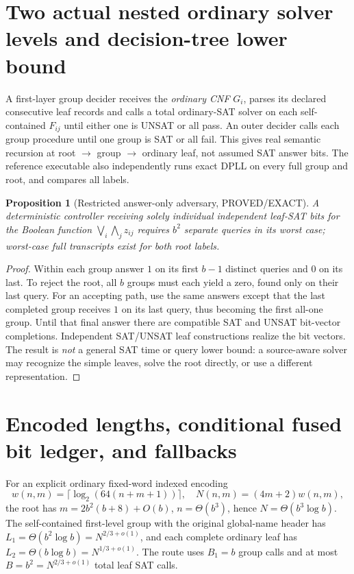 \documentclass[11pt]{article}
\newtheorem{proposition}[theorem]{Proposition}
\begin{document}
\section{Two actual nested ordinary solver levels and decision-tree lower bound}
A first-layer group decider receives the \emph{ordinary CNF} $G_i$, parses its declared consecutive leaf records and calls a total ordinary-SAT solver on each self-contained $F_{ij}$ until either one is UNSAT or all pass. An outer decider calls each group procedure until one group is SAT or all fail. This gives real semantic recursion at root $\to$ group $\to$ ordinary leaf, not assumed SAT answer bits. The reference executable also independently runs exact DPLL on every full group and root, and compares all labels.

\begin{proposition}[Restricted answer-only adversary, PROVED/EXACT]
A deterministic controller receiving solely individual independent leaf-SAT bits for the Boolean function $\bigvee_i\bigwedge_j z_{ij}$ requires $b^2$ separate queries in its worst case; worst-case full transcripts exist for both root labels.
\end{proposition}
\begin{proof}
Within each group answer $1$ on its first $b-1$ distinct queries and $0$ on its last. To reject the root, all $b$ groups must each yield a zero, found only on their last query. For an accepting path, use the same answers except that the last completed group receives $1$ on its last query, thus becoming the first all-one group. Until that final answer there are compatible SAT and UNSAT bit-vector completions. Independent SAT/UNSAT leaf constructions realize the bit vectors. The result is \emph{not} a general SAT time or query lower bound: a source-aware solver may recognize the simple leaves, solve the root directly, or use a different representation.
\end{proof}

\section{Encoded lengths, conditional fused bit ledger, and fallbacks}
For an explicit ordinary fixed-word indexed encoding
\[
w(n,m)=\lceil\log_2(64(n+m+1))\rceil,\quad N(n,m)=(4m+2)w(n,m),
\]
the root has $m=2b^2(b+8)+O(b)$, $n=\Theta(b^3)$, hence $N=\Theta(b^3\log b)$. The self-contained first-level group with the original global-name header has $L_1=\Theta(b^2\log b)=N^{2/3+o(1)}$, and each complete ordinary leaf has $L_2=\Theta(b\log b)=N^{1/3+o(1)}$. The route uses $B_1=b$ group calls and at most $B=b^2=N^{2/3+o(1)}$ total leaf SAT calls.
\end{document}
